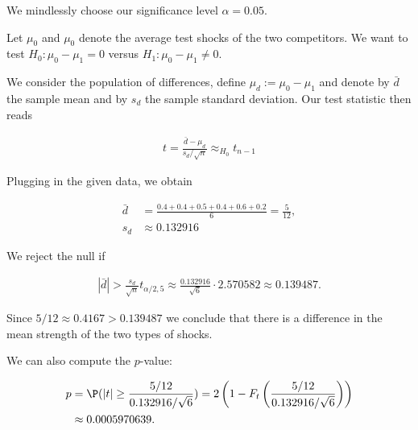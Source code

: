 \begin{solution}

We mindlessly choose our significance level $\alpha = 0.05$.

Let $\mu_0$ and $\mu_0$ denote the average test shocks of the two competitors.
We want to test $H_0: \mu_0 - \mu_1 = 0$ versus $H_1: \mu_0 - \mu_1 \neq 0$.

We consider the population of differences, define $\mu_d := \mu_0 - \mu_1$ and denote by $\bar{d}$ the sample mean
and by $s_d$ the sample standard deviation. Our test statistic then reads

\begin{align*}
    t = \frac{\bar{d} - \mu_d}{s_d/\sqrt{n}} \approx_{H_0} t_{n-1}
\end{align*}

Plugging in the given data, we obtain

\begin{align*}
    \bar{d} &= \frac{0.4 + 0.4 + 0.5 + 0.4 + 0.6 + 0.2}{6} = \frac{5}{12}, \\
    s_d &\approx 0.132916
\end{align*}

We reject the null if

\begin{align*}
    |\bar{d}| > \frac{s_d}{\sqrt{n}}t_{\alpha/2, 5} 
    \approx \frac{0.132916}{\sqrt{6}} \cdot 2.570582 \approx 0.139487.
\end{align*}

Since $5/12 \approx 0.4167 > 0.139487$ we conclude that 
there is a difference in the mean strength of the two types of shocks.

We can also compute the $p$-value:

\begin{align*}
    p &= \P(|t| \geq \frac{5/12}{0.132916 / \sqrt{6}}) 
    = 2\left(1 - F_t\left(\frac{5/12}{0.132916 / \sqrt{6}}\right)\right) \\
    &\approx 0.0005970639.
\end{align*}


\end{solution}

